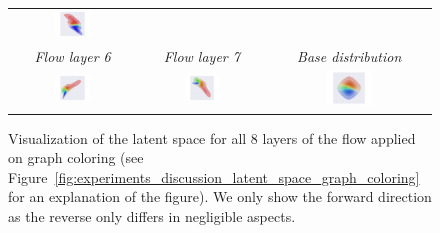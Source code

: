 \begin{figure}[b!]
\begin{tabular}{ccc}
        \includegraphics[width=0.3\textwidth]{figures/experiments_figures/latent_space/graph_coloring/layer_forward_16.pdf}
        \\[0.4cm]
        \textit{Flow layer 6} &
        \textit{Flow layer 7} & 
        \textit{Base distribution} \\
        \includegraphics[width=0.3\textwidth]{figures/experiments_figures/latent_space/graph_coloring/layer_forward_19.pdf} & 
        \includegraphics[width=0.3\textwidth]{figures/experiments_figures/latent_space/graph_coloring/layer_forward_22.pdf}  & 
        \includegraphics[width=0.3\textwidth]{figures/experiments_figures/latent_space/graph_coloring/layer_forward_25.pdf}
        \\
    \end{tabular}
    \caption[Complete latent space of graph coloring flow (large)]{Visualization of the latent space for all 8 layers of the flow applied on graph coloring (see Figure~\ref{fig:experiments_discussion_latent_space_graph_coloring} for an explanation of the figure). We only show the forward direction as the reverse only differs in negligible aspects.}
    \label{fig:appendix_latent_space_visualization_graph_coloring}
\end{figure}

